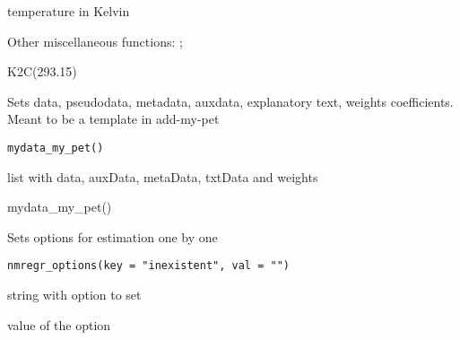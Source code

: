 \documentclass[a4paper]{book}
\begin{document}
%
\begin{Value}
temperature in Kelvin
\end{Value}
%
\begin{SeeAlso}\relax
Other miscellaneous functions: ;
\end{SeeAlso}
%
\begin{Examples}
\begin{ExampleCode}
K2C(293.15)
\end{ExampleCode}
\end{Examples}
%
\begin{Description}\relax
Sets data, pseudodata, metadata, auxdata, explanatory text, weights coefficients. Meant to be a template in add-my-pet
\end{Description}
%
\begin{Usage}
\begin{verbatim}
mydata_my_pet()
\end{verbatim}
\end{Usage}
%
\begin{Value}
list with data, auxData, metaData, txtData and weights
\end{Value}
%
\begin{Examples}
\begin{ExampleCode}
mydata_my_pet()
\end{ExampleCode}
\end{Examples}
%
\begin{Description}\relax
Sets options for estimation one by one
\end{Description}
%
\begin{Usage}
\begin{verbatim}
nmregr_options(key = "inexistent", val = "")
\end{verbatim}
\end{Usage}
%
\begin{Arguments}
\begin{ldescription}
\item[\code{key}] string with option to set

\item[\code{val}] value of the option
\end{ldescription}
\end{Arguments}
%
\end{document}
